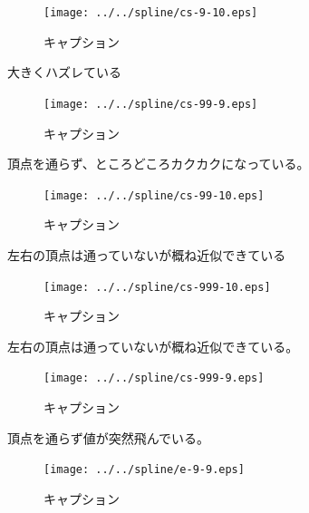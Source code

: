 \documentclass[titlepage, a4paper, 11pt, dvipdfmx]{jsarticle}
\begin{document}
\begin{figure}[H]
  \begin{center}%
    \texttt{[image: ../../spline/cs-9-10.eps]}%
  \caption{キャプション}
  \label{Label}%
  \end{center}
\end{figure}
大きくハズレている
\begin{figure}[H]
  \begin{center}%
    \texttt{[image: ../../spline/cs-99-9.eps]}%
  \caption{キャプション}
  \label{Label}%
  \end{center}
\end{figure}


頂点を通らず、ところどころカクカクになっている。

\begin{figure}[H]
  \begin{center}%
    \texttt{[image: ../../spline/cs-99-10.eps]}%
  \caption{キャプション}
  \label{Label}%
  \end{center}
\end{figure}

左右の頂点は通っていないが概ね近似できている

\begin{figure}[H]
  \begin{center}%
    \texttt{[image: ../../spline/cs-999-10.eps]}%
  \caption{キャプション}
  \label{Label}%
  \end{center}
\end{figure}

左右の頂点は通っていないが概ね近似できている。

\begin{figure}[H]
  \begin{center}%
    \texttt{[image: ../../spline/cs-999-9.eps]}%
  \caption{キャプション}
  \label{Label}%
  \end{center}
\end{figure}
頂点を通らず値が突然飛んでいる。

\begin{figure}[H]
  \begin{center}%
    \texttt{[image: ../../spline/e-9-9.eps]}%
  \caption{キャプション}
  \label{Label}%
  \end{center}
\end{figure}
\end{document}
